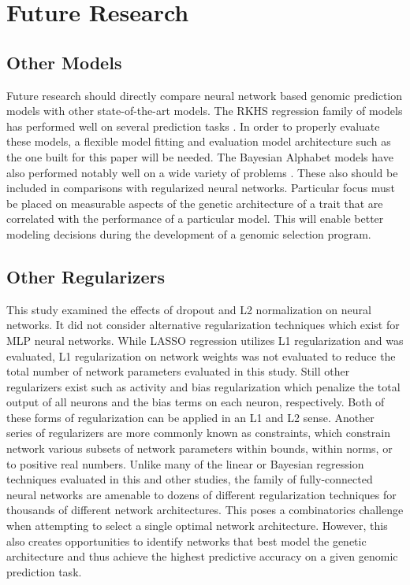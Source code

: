 \section{Future Research}

\subsection*{Other Models}
Future research should directly compare neural network based genomic prediction
models with other state-of-the-art models. The RKHS regression family of models
has performed well on several prediction tasks \citep{heslot2012, crossa2010, gonzalez-recio2014, gianola2006}.
In order to properly evaluate these models, a flexible model fitting
and evaluation model architecture such as the one built for this paper will be
needed. The Bayesian Alphabet models have also performed notably well on
a wide variety of problems \citep{heslot2012, crossa2010, thavamanikumar2015}.
These also should be included in comparisons with regularized neural networks.
Particular focus must be placed on measurable aspects of the genetic architecture 
of a trait that are correlated with the performance of a particular model. This will 
enable better modeling decisions during the development of a genomic selection program.

\subsection*{Other Regularizers}

This study examined the effects of dropout and L2 normalization on neural networks. It 
did not consider alternative regularization techniques which exist for MLP neural
networks. While LASSO regression utilizes L1 regularization and was evaluated, 
L1 regularization on network weights was not evaluated 
to reduce the total number of network parameters evaluated in this study. 
Still other regularizers exist such as activity and bias regularization which 
penalize the total output of all neurons and the bias terms on each neuron, 
respectively. Both of these forms of regularization 
can be applied in an L1 and L2 sense. Another series of regularizers are more commonly
known as constraints, which constrain network various subsets of network parameters 
within bounds, within norms, or to positive real numbers. Unlike many of the 
linear or Bayesian regression techniques evaluated in this and other studies, 
the family of fully-connected neural networks are amenable to dozens of different 
regularization techniques for thousands of different network architectures. This poses
a combinatorics challenge when attempting to select a single optimal network 
architecture. However, this also creates opportunities to identify networks that 
best model the genetic architecture and thus achieve the highest predictive 
accuracy on a given genomic prediction task.

